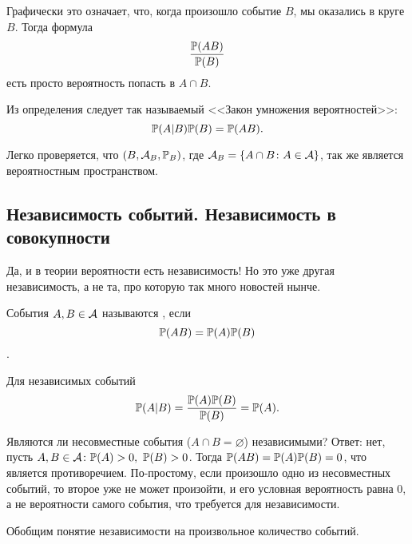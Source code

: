 \documentclass[../TV&MS.tex]{subfiles}
\begin{document}
\noindent
\parbox[b][3 cm][t]{40mm}{}
\hfill
\parbox[b][3 cm][t]{80mm}{
	Графически это означает, что, когда произошло событие $B$, мы оказались в круге $B$. 
	Тогда формула $$\frac{\mathbb{P}(AB)}{\mathbb{P}(B)}$$ есть просто вероятность попасть в $A\cap B$.
}

\newpage

Из определения следует так называемый <<Закон умножения вероятностей>>:
$$\mathbb{P}(A|B)\mathbb{P}(B)=\mathbb{P}(AB).$$

Легко проверяется, что $(B, \mathcal{A}_B, \mathbb{P}_B)$, где $\mathcal{A}_B = \left\{ A \cap B \colon A \in \mathcal{A} \right\}$, 
так же является вероятностным пространством.


\subsection{Независимость событий. Независимость в совокупности}

\qquad Да, и в теории вероятности есть независимость! Но это уже другая независимость, 
а не та, про которую так много новостей нынче.

\begin{Def}
События $A, B \in \mathcal{A}$ называются , если 
$$\mathbb{P}(AB) = \mathbb{P}(A) \mathbb{P}(B)$$.
\end{Def}

Для независимых событий $$\mathbb{P}(A|B) = \frac{\mathbb{P}(A)\mathbb{P}(B)}{\mathbb{P}(B)} = \mathbb{P}(A).$$

\begin{Ex}
Являются ли несовместные события ($A\cap B = \varnothing$) независимыми? 
Ответ: нет, пусть  $A, B \in \mathcal{A} \colon \mathbb{P}(A) > 0, \ \mathbb{P}(B) > 0$. 
Тогда $\mathbb{P}(AB) = \mathbb{P}(A)\mathbb{P}(B) = 0$, что является противоречием. По-простому, 
если произошло одно из несовместных событий, то второе уже не может произойти, 
и его условная вероятность равна $0$, а не вероятности самого события, 
что требуется для независимости.
\end{Ex}

Обобщим понятие независимости на произвольное количество событий.
\end{document}
